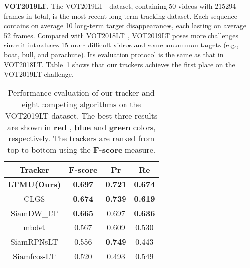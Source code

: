 \documentclass[10pt,twocolumn,letterpaper]{article}
\begin{document}
\noindent \textbf{VOT2019LT.} The VOT2019LT~\cite{VOT2019report} dataset, containing $50$ videos
with 215294 frames in total, is the most recent long-term tracking dataset.
Each sequence contains on average 10 long-term target disappearances, each lasting on average 52 frames.
Compared with VOT2018LT~\cite{VOT2018report}, VOT2019LT poses more challenges since it introduces
15 more difficult videos and some uncommon targets (e.g., boat, bull, and parachute).
Its evaluation protocol is the same as that in VOT2018LT.
Table~\ref{tab:votlt19tab} shows that our trackers achieves the first place on the VOT2019LT challenge.
\vspace{-2mm}
\begin{table}[h]
\caption{Performance evaluation of our tracker and eight competing algorithms on the VOT2019LT dataset.
The best three results are shown in \textcolor[rgb]{1,0,0}{\textbf{red}}
, \textcolor[rgb]{0,0,1}{\textbf{blue}} and  \textcolor[rgb]{0,1,0}{\textbf{green}} colors, respectively.
The trackers are ranked from top to bottom using the \textbf{F-score} measure.}
\label{tab:votlt19tab}
\vspace{-2mm}
\small
\begin{center}
\begin{tabular}{cccc}
\hline
\textbf{Tracker} & \textbf{F-score}                      & \textbf{Pr}                           & \textbf{Re}                           \\ \hline
\textbf{LTMU(Ours)}
					   & {\color[HTML]{FE0000} \textbf{0.697}}
					   & {\color[HTML]{32CB00} \textbf{0.721}}
					   & {\color[HTML]{FE0000} \textbf{0.674}} \\
CLGS             & {\color[HTML]{3166FF} \textbf{0.674}} & {\color[HTML]{3166FF} \textbf{0.739}}
                       & {\color[HTML]{32CB00} \textbf{0.619}} \\
SiamDW\_LT       & {\color[HTML]{32CB00} \textbf{0.665}} & 0.697
                            & {\color[HTML]{3166FF} \textbf{0.636}} \\
mbdet               & 0.567                                 & 0.609                                 & 0.530                                 \\
SiamRPNsLT   & 0.556                                 & {\color[HTML]{FE0000} \textbf{0.749}} & 0.443                                 \\
Siamfcos-LT    & 0.520                                 & 0.493                                 & 0.549                                 \\

\end{tabular}
\end{center}
\end{table}
\end{document}
